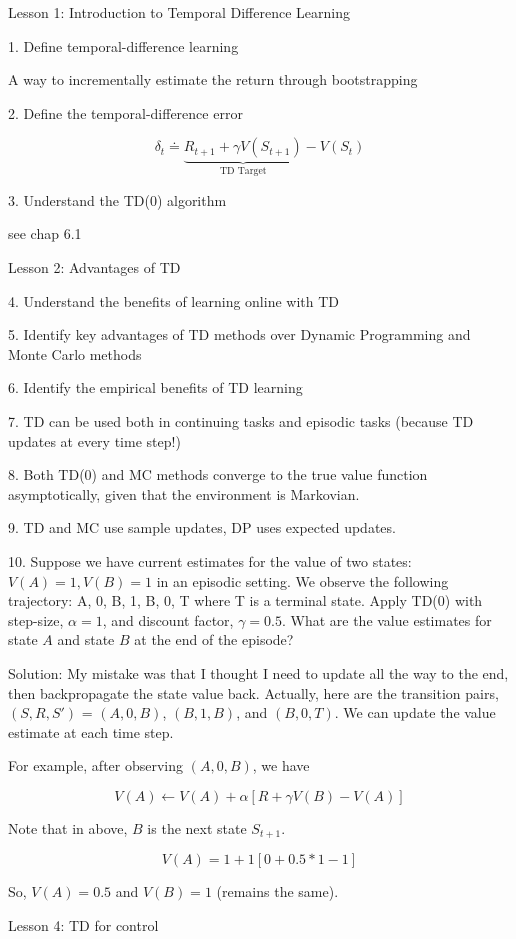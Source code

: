 \documentclass[sutton_barto_notes.tex]{subfiles}
\begin{document}
Lesson 1: Introduction to Temporal Difference Learning

1. Define temporal-difference learning

A way to incrementally estimate the return through bootstrapping

2. Define the temporal-difference error

$$\delta_t \doteq \underbrace{R_{t+1} + \gamma V(S_{t+1})}_\text{TD Target} - V(S_t)$$

3. Understand the TD(0) algorithm

see chap 6.1

Lesson 2: Advantages of TD

4. Understand the benefits of learning online with TD

5. Identify key advantages of TD methods over Dynamic Programming and Monte Carlo methods

6. Identify the empirical benefits of TD learning

7. TD can be used both in continuing tasks and episodic tasks (because TD updates at every time step!)

8. Both TD(0) and MC methods converge to the true value function asymptotically, given that the environment is Markovian.

9. TD and MC use sample updates, DP uses expected updates.

10. Suppose we have current estimates for the value of two states: $V(A) = 1, V(B) = 1$ in an episodic setting. We observe the following trajectory: A, 0, B, 1, B, 0, T where T is a terminal state. Apply TD(0) with step-size, $\alpha = 1$, and discount factor, $\gamma = 0.5$. What are the value estimates for state $A$ and state $B$ at the end of the episode?

Solution: My mistake was that I thought I need to update all the way to the end, then backpropagate the state value back.
Actually, here are the transition pairs, $(S, R, S')$ = $(A, 0, B)$, $(B, 1, B)$, and $(B, 0, T)$. We can update the value estimate at each time step.

For example, after observing $(A, 0, B)$, we have

$$V(A) \leftarrow V(A) + \alpha [R + \gamma V(B) - V(A)]$$

Note that in above, $B$ is the next state $S_{t+1}$.

$$V(A) = 1 + 1 [0 + 0.5 * 1 - 1]$$

So, $V(A) = 0.5$ and $V(B) = 1$ (remains the same).

Lesson 4: TD for control
\end{document}
